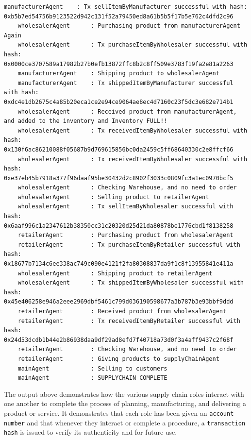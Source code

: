 \begin{itemize}
\begin{lstlisting}[caption={Agent Interaction (Scenario 4},label={Scenario4}, numbers=none, basicstyle=\ttfamily\tiny]
    manufacturerAgent    : Tx sellItemByManufacturer successful with hash: 0xb5b7ed54756b9123522d942c131f52a79450ed8a61b5b5f17b5e762c4dfd2c96
    wholesalerAgent      : Purchasing product from manufacturerAgent Again
    wholesalerAgent      : Tx purchaseItemByWholesaler successful with hash: 0x0000ce3707589a17982b27b0efb13872ffc8b2c8ff509e3783f19fa2e81a2263
    manufacturerAgent    : Shipping product to wholesalerAgent
    manufacturerAgent    : Tx shippedItemByManufacturer successful with hash: 0xdc4e1db2675c4a85b20eca1ce2e94ce9064ae8ec4d7160c23f5dc3e682e714b1
    wholesalerAgent      : Received product from manufacturerAgent, and added to the inventory and Inventory FULL!!
    wholesalerAgent      : Tx receivedItemByWholesaler successful with hash: 0x130f6ac86210088f05687b9d769615856bc0da2459c5ff68640330c2e8ffcf66
    wholesalerAgent      : Tx receivedItemByWholesaler successful with hash: 0xe37eb45b7918a377f96daaf95be30432d2c8902f3033c0809fc3a1ec0970bcf5
    wholesalerAgent      : Checking Warehouse, and no need to order
    wholesalerAgent      : Selling product to retailerAgent
    wholesalerAgent      : Tx sellItemByWholesaler successful with hash: 0x6aaf996c1a2347612b38350cc31c20320d25d21da80878be1776cbd1f8138258
    retailerAgent        : Purchasing product from wholesalerAgent
    retailerAgent        : Tx purchaseItemByRetailer successful with hash: 0x18677b7134c6ee338ac749c090e4121f2fa80308837da9f1c8f13955841e411a
    wholesalerAgent      : Shipping product to retailerAgent
    wholesalerAgent      : Tx shippedItemByWholesaler successful with hash: 0x45e406258e946a2eee2969dbf5461c799d036190598677a3b787b3e93bbf9ddd
    retailerAgent        : Received product from wholesalerAgent
    retailerAgent        : Tx receivedItemByRetailer successful with hash: 0x24d53dcdb1b44e2b86938daa9df29ad8efd7f40718a73d0f3a4aff9437c2f68f
    retailerAgent        : Checking Warehouse, and no need to order
    retailerAgent        : Giving products to supplyChainAgent
    mainAgent            : Selling to customers
    mainAgent            : SUPPLYCHAIN COMPLETE
    \end{lstlisting}
    
    \end{itemize}


The output above demonstrates how the various supply chain roles interact with one another to complete the process of planning, manufacturing, and delivering a product or service. It demonstrates that each role has been given an \texttt{account number} and that whenever they interact or complete a procedure, a \texttt{transaction hash} is issued to verify its authenticity and for future use.

